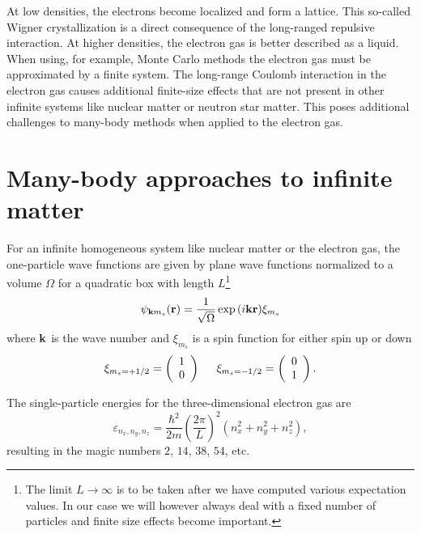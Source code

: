 \documentclass[aps,prc,twocolumn,showpacs,floatfix,nofootinbib,preprintnumbers,superscriptaddress,amsmath,amssymb]{revtex4-1}
\begin{document}
At low densities, the electrons become 
localized and form a lattice. This so-called Wigner 
crystallization is a direct consequence 
of the long-ranged repulsive interaction. At higher
densities, the electron gas is better described as a
liquid.
When using, for example, Monte Carlo methods the electron gas must be approximated 
by a finite system. The long-range Coulomb interaction 
in the electron gas causes additional finite-size effects  that are not
present in other infinite systems like nuclear matter or neutron star matter.
This poses additional challenges to many-body methods when applied 
to the electron gas.



\section*{Many-body approaches to infinite matter}
For an infinite homogeneous system  like nuclear matter or the electron gas, 
the one-particle wave functions are given by plane wave functions
normalized to a volume $\Omega$ for a quadratic box with length
$L$\footnote{The limit $L\rightarrow \infty$ is to be taken after we
  have computed various expectation values. In our case we will
  however always deal with a fixed number of particles and finite size
  effects become important. }
\[
\psi_{{\bf k}m_s}({\bf r})= \frac{1}{\sqrt{\Omega}}\exp{(i{\bf kr})}\xi_{m_s}
\]
where ${\bf k}$ is the wave number and $\xi_{m_s}$ is a spin function
for either spin up or down
\[ 
\xi_{m_{s}=+1/2}=\left(\begin{array}{c} 1
  \\ 0 \end{array}\right) \hspace{0.5cm}
\xi_{m_{s}=-1/2}=\left(\begin{array}{c} 0 \\ 1 \end{array}\right).\]

The single-particle energies for the three-dimensional electron gas
are
\[    
\varepsilon_{n_{x}, n_{y}, n_{z}} = \frac{\hbar^{2}}{2m}\left( \frac{2\pi }{L}\right)^{2}(n_{x}^{2}+n_{y}^{2}+n_{z}^{2}),
\]
resulting in the magic numbers $2$, $14$, $38$, $54$, etc.  
\end{document}
